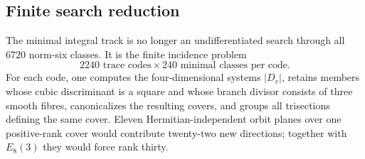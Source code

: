 \subsection{Finite search reduction}

The minimal integral track is no longer an undifferentiated search through all
$6720$ norm-six classes.  It is the finite incidence problem
\[
\boxed{
2240\text{ trace codes}\times240\text{ minimal classes per code}.
}
\]
For each code, one computes the four-dimensional systems $|D_v|$, retains
members whose cubic discriminant is a square and whose branch divisor consists
of three smooth fibres, canonicalizes the resulting covers, and groups all
trisections defining the same cover.  Eleven Hermitian-independent orbit
planes over one positive-rank cover would contribute twenty-two new
directions; together with $E_8(3)$ they would force rank thirty.
